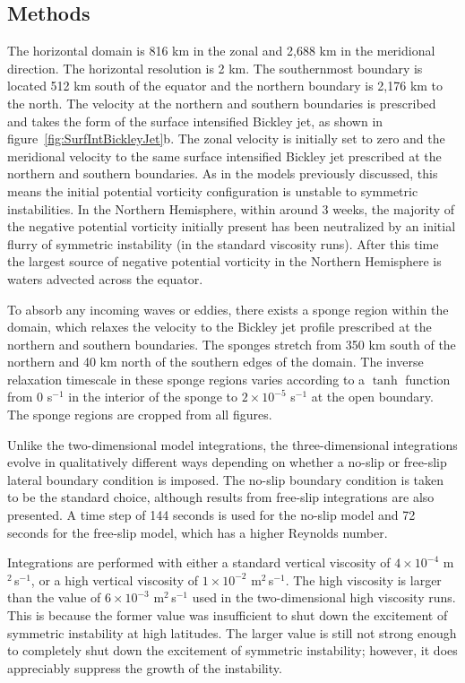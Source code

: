\subsection{Methods}
The horizontal domain is 816 km in the zonal and 2,688 km in the meridional direction. The horizontal resolution is 2 km. The southernmost boundary is located 512 km south of the equator and the northern boundary is 2,176 km to the north. The velocity at the northern and southern boundaries is prescribed and takes the form of the surface intensified Bickley jet, as shown in figure~\ref{fig:SurfIntBickleyJet}b. The zonal velocity is initially set to zero and the meridional velocity to the same surface intensified Bickley jet prescribed at the northern and southern boundaries. As in the models previously discussed, this means the initial potential vorticity configuration is unstable to symmetric instabilities. In the Northern Hemisphere, within around 3 weeks, the majority of the negative potential vorticity initially present has been neutralized by an initial flurry of symmetric instability (in the standard viscosity runs). After this time the largest source of negative potential vorticity in the Northern Hemisphere is waters advected across the equator.

To absorb any incoming waves or eddies, there exists a sponge region within the domain, which relaxes the velocity to the Bickley jet profile prescribed at the northern and southern boundaries. The sponges stretch from 350 km south of the northern and 40 km north of the southern edges of the domain. The inverse relaxation timescale in these sponge regions varies according to a $\tanh$ function from 0 s$^{-1}$ in the interior of the sponge to $2 \times 10^{-5}$ s$^{-1}$ at the open boundary. The sponge regions are cropped from all figures.

Unlike the two-dimensional model integrations, the three-dimensional integrations evolve in qualitatively different ways depending on whether a no-slip or free-slip lateral boundary condition is imposed. The no-slip boundary condition is taken to be the standard choice, although results from free-slip integrations are also presented. A time step of 144 seconds is used for the no-slip model and 72 seconds for the free-slip model, which has a higher Reynolds number.

Integrations are performed with either a standard vertical viscosity of $4\times 10^{-4}$ m$^2$\,s$^{-1}$, or a high vertical viscosity of $1\times 10^{-2}$ m$^2$\,s$^{-1}$. The high viscosity is larger than the value of $6\times 10^{-3}$ m$^2$\,s$^{-1}$ used in the two-dimensional high viscosity runs. This is because the former value was insufficient to shut down the excitement of symmetric instability at high latitudes. The larger value is still not strong enough to completely shut down the excitement of symmetric instability; however, it does appreciably suppress the growth of the instability.

